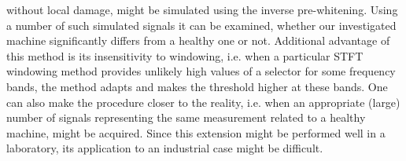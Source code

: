 without local damage, might be simulated using the inverse pre-whitening. Using a number of such simulated signals it can be examined, whether our investigated machine significantly differs from a healthy one or not. Additional advantage of this method is its insensitivity to windowing, i.e. when a particular STFT windowing method provides unlikely high values of a selector for some frequency bands, the method adapts and makes the threshold higher at these bands. One can also make the procedure closer to the reality, i.e. when an appropriate (large) number of signals representing the same measurement related to a healthy machine, might be acquired. Since this extension might be performed well in a laboratory, its application to an industrial case might be difficult.
\FloatBarrier